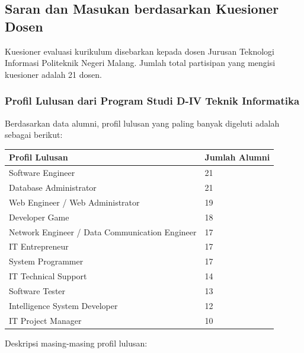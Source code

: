 \subsection{Saran dan Masukan berdasarkan Kuesioner Dosen}

Kuesioner evaluasi kurikulum disebarkan kepada dosen Jurusan Teknologi Informasi Politeknik Negeri Malang. Jumlah total partisipan yang mengisi kuesioner adalah 21 dosen.

\subsubsection{Profil Lulusan dari Program Studi D-IV Teknik Informatika}

Berdasarkan data alumni, profil lulusan yang paling banyak digeluti adalah sebagai berikut:

\begin{center}
\begin{tabular}{L{9cm}C{3cm}}
\toprule
Profil Lulusan & Jumlah Alumni \\
\midrule
Software Engineer & 21 \\
Database Administrator & 21 \\
Web Engineer / Web Administrator & 19 \\
Developer Game & 18 \\
Network Engineer / Data Communication Engineer & 17 \\
IT Entrepreneur & 17 \\
System Programmer & 17 \\
IT Technical Support & 14 \\
Software Tester & 13 \\
Intelligence System Developer & 12 \\
IT Project Manager & 10 \\
\bottomrule
\end{tabular}
\end{center}

Deskripsi masing-masing profil lulusan:


